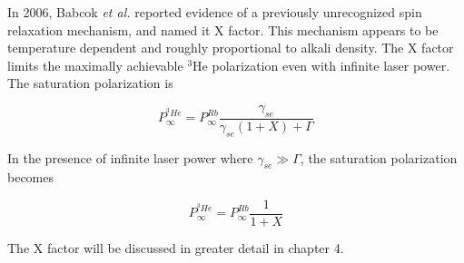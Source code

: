 In 2006, Babcok \emph{et al.} reported evidence of a previously unrecognized spin relaxation mechanism, and named it X factor. This mechanism appears to be temperature dependent and roughly proportional to alkali density. The X factor limits the maximally achievable $^{3}$He polarization even with infinite laser power. The saturation polarization is 

\begin{equation}
P_{\infty}^{^{3}He}=P_{\infty}^{Rb}\frac{\gamma_{se}}{\gamma_{se}(1+X)+\Gamma}
\end{equation}

In the presence of infinite laser power where $\gamma_{se} \gg \Gamma$, the saturation polarization becomes

\begin{equation}
P_{\infty}^{^{3}He}=P_{\infty}^{Rb}\frac{1}{1+X}
\end{equation}

The X factor will be discussed in greater detail in chapter 4.


















